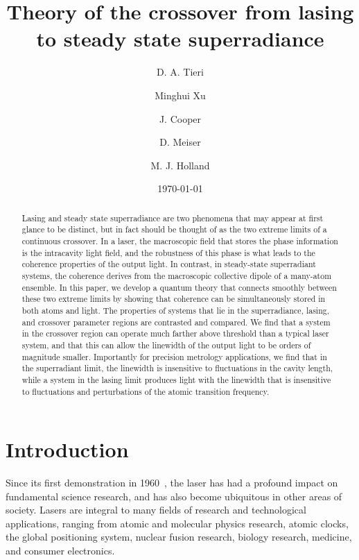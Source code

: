 \documentclass[aps,
twocolumn,
superscriptaddress,groupedaddress]{revtex4}
\begin{document}
\title{Theory of the crossover from lasing to steady state superradiance}
\author{D. A. Tieri}
\author{Minghui Xu}
\author{J. Cooper}
\author{D. Meiser}
\author{M. J. Holland}
\date{\today}

\begin{abstract}
  Lasing and steady state superradiance are two phenomena that may
  appear at first glance to be distinct, but in fact should be thought
  of as the two extreme limits of a continuous crossover. In a laser,
  the macroscopic field that stores the phase information is the
  intracavity light field, and the robustness of this phase is what
  leads to the coherence properties of the output light. In contrast,
  in steady-state superradiant systems, the coherence derives from the
  macroscopic collective dipole of a many-atom ensemble. In this
  paper, we develop a quantum theory that connects smoothly between
  these two extreme limits by showing that coherence can be
  simultaneously stored in both atoms and light. The properties of
  systems that lie in the superradiance, lasing, and crossover parameter
  regions are contrasted and compared. We find that a system in the
  crossover region can operate much farther above threshold than a
  typical laser system, and that this can allow the linewidth of the
  output light to be orders of magnitude smaller. Importantly for
  precision metrology applications, we find that in the superradiant
  limit, the linewidth is insensitive to fluctuations in the cavity
  length, while a system in the lasing limit produces light with the
  linewidth that is insensitive to fluctuations and perturbations of the
  atomic transition frequency.
\end{abstract}
\maketitle

\section{Introduction}
Since its first demonstration in 1960~\cite{maiman1960stimulated}, the
laser has had a profound impact on fundamental science research, and
has also become ubiquitous in other areas of society. Lasers are
integral to many fields of research and technological applications, ranging from
atomic and molecular physics research, atomic clocks, the global
positioning system, nuclear fusion research, biology research,
medicine, and consumer electronics.
\end{document}
